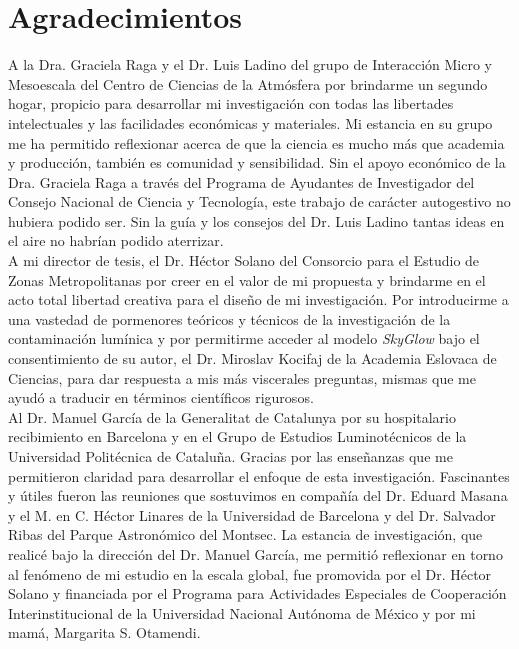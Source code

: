 \chapter{Agradecimientos}

A la Dra. Graciela Raga y el Dr. Luis Ladino del grupo de Interacción Micro y Mesoescala del Centro de Ciencias de la Atmósfera por brindarme un segundo hogar, propicio para desarrollar mi investigación con todas las libertades intelectuales y las facilidades económicas y materiales. Mi estancia en su grupo me ha permitido reflexionar acerca de que la ciencia es mucho más que academia y producción, también es comunidad y sensibilidad. Sin el apoyo económico de la Dra. Graciela Raga a través del Programa de Ayudantes de Investigador del Consejo Nacional de Ciencia y Tecnología, este trabajo de carácter autogestivo no hubiera podido ser. Sin la guía y los consejos del Dr. Luis Ladino tantas ideas en el aire no habrían podido aterrizar.\\

A mi director de tesis, el Dr. Héctor Solano del Consorcio para el Estudio de Zonas Metropolitanas por creer en el valor de mi propuesta y brindarme en el acto total libertad creativa para el diseño de mi investigación. Por introducirme a una vastedad de pormenores teóricos y técnicos de la investigación de la contaminación lumínica y por permitirme acceder al modelo \textit{SkyGlow} bajo el consentimiento de su autor, el Dr. Miroslav Kocifaj de la Academia Eslovaca de Ciencias, para dar respuesta a mis más viscerales preguntas, mismas que me ayudó a traducir en términos científicos rigurosos.\\

Al Dr. Manuel García de la Generalitat de Catalunya por su hospitalario recibimiento en Barcelona y en el Grupo de Estudios Luminotécnicos de la Universidad Politécnica de Cataluña. Gracias por las enseñanzas que me permitieron claridad para desarrollar el enfoque de esta investigación. Fascinantes y útiles fueron las reuniones que sostuvimos en compañía del Dr. Eduard Masana y el M. en C. Héctor Linares de la Universidad de Barcelona y del Dr. Salvador Ribas del Parque Astronómico del Montsec. La estancia de investigación, que realicé bajo la dirección del Dr. Manuel García, me permitió reflexionar en torno al fenómeno de mi estudio en la escala global, fue promovida por el Dr. Héctor Solano y financiada por el Programa para Actividades Especiales de Cooperación Interinstitucional de la Universidad Nacional Autónoma de México y por mi mamá, Margarita S. Otamendi.\\


